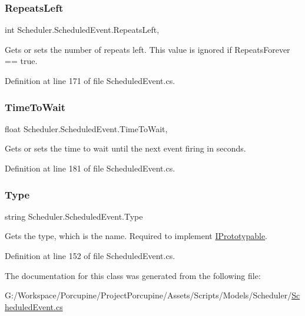 \subsubsection{\texorpdfstring{Repeats\+Left}{RepeatsLeft}}
{\footnotesize\ttfamily int Scheduler.\+Scheduled\+Event.\+Repeats\+Left\hspace{0.3cm}{\ttfamily [get]}, {}}



Gets or sets the number of repeats left. This value is ignored if Repeats\+Forever == true. 



Definition at line 171 of file Scheduled\+Event.\+cs.

\mbox{\label{class_scheduler_1_1_scheduled_event_afb4173ede6077c7adf54950499164a45}} 
\subsubsection{\texorpdfstring{Time\+To\+Wait}{TimeToWait}}
{\footnotesize\ttfamily float Scheduler.\+Scheduled\+Event.\+Time\+To\+Wait\hspace{0.3cm}{\ttfamily [get]}, {}}



Gets or sets the time to wait until the next event firing in seconds. 



Definition at line 181 of file Scheduled\+Event.\+cs.

\mbox{\label{class_scheduler_1_1_scheduled_event_a5a98cd2dcf9a67d898bed91d7e65eedf}} 
\subsubsection{\texorpdfstring{Type}{Type}}
{\footnotesize\ttfamily string Scheduler.\+Scheduled\+Event.\+Type\hspace{0.3cm}{\ttfamily [get]}}



Gets the type, which is the name. Required to implement \hyperlink{interface_i_prototypable}{I\+Prototypable}. 



Definition at line 152 of file Scheduled\+Event.\+cs.



The documentation for this class was generated from the following file\+:\begin{DoxyCompactItemize}
\item 
G\+:/\+Workspace/\+Porcupine/\+Project\+Porcupine/\+Assets/\+Scripts/\+Models/\+Scheduler/\hyperlink{_scheduled_event_8cs}{Scheduled\+Event.\+cs}\end{DoxyCompactItemize}
